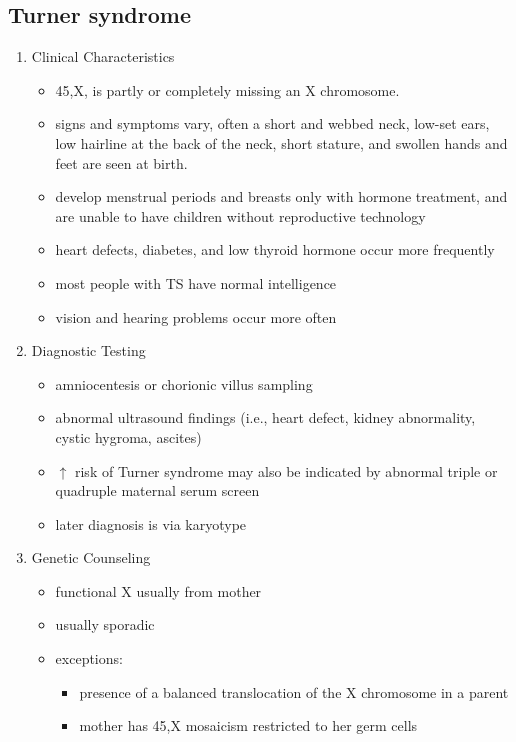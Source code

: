 \documentclass[12pt]{scrartcl}
\begin{document}
\subsection{Turner syndrome}
\label{sec:org5279b0b}
\begin{enumerate}
\item Clinical Characteristics
\label{sec:org7a370f9}
\begin{itemize}
\item 45,X, \female is partly or completely missing an X chromosome.
\item signs and symptoms vary, often a short and webbed neck, low-set
ears, low hairline at the back of the neck, short stature, and
swollen hands and feet are seen at birth.
\item develop menstrual periods and breasts only with hormone treatment,
and are unable to have children without reproductive technology
\item heart defects, diabetes, and low thyroid hormone occur more
frequently
\item most people with TS have normal intelligence
\item vision and hearing problems occur more often
\end{itemize}
\item Diagnostic Testing
\label{sec:org6d9435c}
\begin{itemize}
\item amniocentesis or chorionic villus sampling
\item abnormal ultrasound findings (i.e., heart defect, kidney
abnormality, cystic hygroma, ascites)
\item \(\uparrow\) risk of Turner syndrome may also be indicated by abnormal
triple or quadruple maternal serum screen
\item later diagnosis is via karyotype
\end{itemize}
\item Genetic Counseling
\label{sec:org69cedc4}
\begin{itemize}
\item functional X usually from mother
\item usually sporadic
\item exceptions:
\begin{itemize}
\item presence of a balanced translocation of the X chromosome in a parent
\item mother has 45,X mosaicism restricted to her germ cells
\end{itemize}
\end{itemize}
\end{enumerate}
\end{document}
